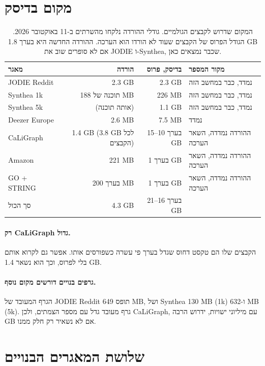 \documentclass[11pt]{article}
\newcommand{\en}[1]{\foreignlanguage{english}{#1}}
\begin{document}
\section*{מקום בדיסק}

\begin{table}[H]
\centering
\small
\begin{tabular}{lrrl}
\toprule
מאגר & הורדה & בדיסק, פרוס & מקור המספר \\
\midrule
\en{JODIE Reddit} & \en{2.3 GB} & \en{2.3 GB} & נמדד, כבר במחשב הזה \\
\en{Synthea 1k} & תוכנה של \en{188 MB} & \en{226 MB} & נמדד, כבר במחשב הזה \\
\en{Synthea 5k} & (אותה תוכנה) & \en{1.1 GB} & נמדד, כבר במחשב הזה \\
\en{Deezer Europe} & \en{2.6 MB} & \en{7.5 MB} & נמדד \\
\en{CaLiGraph} & \en{1.4 GB} (\en{3.8 GB} לכל הקבצים) & בערך \en{10--15 GB} & ההורדה נמדדה, השאר הערכה \\
\en{Amazon} & \en{221 MB} & בערך \en{1 GB} & ההורדה נמדדה, השאר הערכה \\
\en{GO + STRING} & בערך \en{200 MB} & בערך \en{1 GB} & ההורדה נמדדה, השאר הערכה \\
\midrule
סך הכול & \en{4.3 GB} & בערך \en{16--21 GB} & \\
\bottomrule
\end{tabular}
\caption{המקום שדרוש לקבצים הגולמיים. גודלי ההורדה נלקחו מהשרתים ב-11 באוקטובר 2026. הגודל
הפרוס של הקבצים שעוד לא הורדו הוא הערכה. ההורדה החדשה היא בערך \en{1.8 GB} אם לא סופרים שוב את
\en{JODIE} ו-\en{Synthea}, שכבר נמצאים כאן.}
\end{table}

\paragraph{רק \en{CaLiGraph} גדול.} הקבצים שלו הם טקסט דחוס שגדל בערך פי עשרה כשפורסים אותו. אפשר
גם לקרוא אותם בלי לפרוס, וכך הוא נשאר \en{1.4 GB}.

\paragraph{גרפים בנויים דורשים מקום נוסף.} הגרף המעובד של \en{JODIE Reddit} תופס \en{649 MB},
ושל \en{Synthea} \en{130 MB} (\en{1k}) ו-\en{632 MB} (\en{5k}). גרף מעובד גדל עם מספר הצמתים, ולכן
\en{CaLiGraph}, עם מיליוני ישויות, ידרוש הרבה \en{GB} אם לא נשאיר רק חלק ממנו.

\section*{שלושת המאגרים הבנויים}
\end{document}
